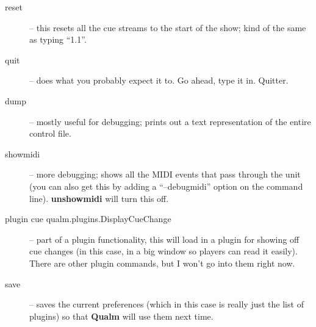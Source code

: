\documentclass{article}
\newcommand{\q}{{\textsf{\textbf{Qualm}}}\xspace}
\begin{document}
\begin{description}
\item[reset] -- this resets all the cue streams to the start of the
      show; kind of the same as typing ``1.1''.

\item[quit] -- does what you probably expect it to.  Go ahead, type it
      in.  Quitter.

\item[dump] -- mostly useful for debugging; prints out a text
      representation of the entire control file.

\item[showmidi] -- more debugging; shows all the MIDI events that pass
      through the unit (you can also get this by adding a ``--debugmidi''
      option on the command line).  {\bf unshowmidi} will turn this
      off.

\item[plugin cue qualm.plugins.DisplayCueChange] -- part of a 
      plugin functionality, this will load in a plugin for showing off
      cue changes (in this case, in a big window so players can read it
      easily).  There are other plugin commands, but I won't go into
      them right now.

\item[save] -- saves the current preferences (which in this case is
      really just the list of plugins) so that \q will use them next
      time.
\end{description}
\end{document}
